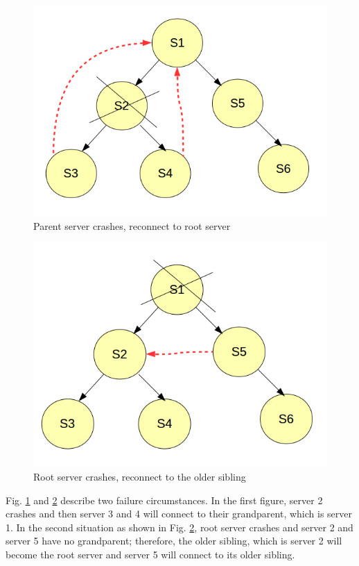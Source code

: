 \documentclass[10pt,twocolumn]{article}
\begin{document}
\begin{figure}[h!]
\begin{center}
\includegraphics[scale=0.4]{parent_crash}
\caption{Parent server crashes, reconnect to root server}
\label{failroot}	
\end{center}
\end{figure}

\begin{figure}[h!]
\begin{center}
\includegraphics[scale=0.4]{root_crash}
\caption{Root server crashes, reconnect to the older sibling}
\label{failsibling}	
\end{center}
\end{figure}

Fig. \ref{failroot} and \ref{failsibling} describe two failure circumstances. In the first figure, server 2 crashes and then server 3 and 4 will connect to their grandparent, which is server 1. In the second situation as shown in Fig. \ref{failsibling}, root server crashes and server 2 and server 5 have no grandparent; therefore, the older sibling, which is server 2 will become the root server and server 5 will connect to its older sibling.
\end{document}
